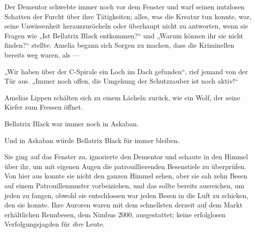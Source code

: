 Der Dementor schwebte immer noch vor dem Fenster und warf seinen nutzlosen Schatten der Furcht über ihre Tätigkeiten; alles, was die Kreatur tun konnte, war, seine Unwissenheit herauszuröcheln oder überhaupt nicht zu antworten, wenn sie Fragen wie
„Ist Bellatrix Black entkommen?“ und
„Warum können ihr sie nicht finden?“ stellte. Amelia begann sich Sorgen zu machen, dass die Kriminellen bereits weg waren, als —

„Wir haben über der C-Spirale ein Loch im Dach gefunden“, rief jemand von der Tür aus.
„Immer noch offen, die Umgehung der Schutzzauber ist noch aktiv!“

Amelias Lippen schälten sich zu einem Lächeln zurück, wie ein Wolf, der seine Kiefer zum Fressen öffnet.

Bellatrix Black war immer noch in Askaban.

Und in Askaban würde Bellatrix Black für immer bleiben.

Sie ging auf das Fenster zu, ignorierte den Dementor und schaute in den Himmel über ihr, um mit eigenen Augen die patrouillierenden Besenstiele zu überprüfen. Von hier aus konnte sie nicht den ganzen Himmel sehen, aber sie sah zehn Besen auf einem Patrouillenmuster vorbeiziehen, und das sollte bereits ausreichen, um jeden zu fangen, obwohl sie entschlossen war jeden Besen in die Luft zu schicken, den sie konnte. Ihre Auroren waren mit dem schnellsten derzeit auf dem Markt erhältlichen Rennbesen, dem Nimbus 2000, ausgestattet; keine erfolglosen Verfolgungsjagden für \emph{ihre} Leute.

